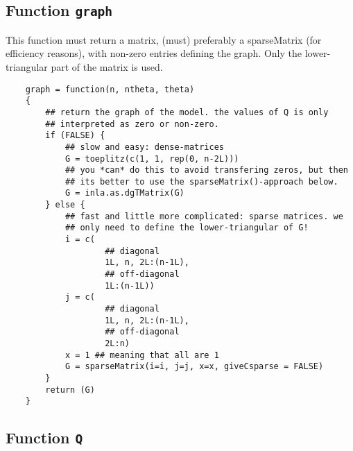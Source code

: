 \documentclass[a4paper,11pt]{article}
\begin{document}
\subsection*{Function \texttt{graph}}

This function must return a matrix, (must) preferably a sparseMatrix
(for efficiency reasons), with non-zero entries defining the
graph. Only the lower-triangular part of the matrix is used.
\begin{verbatim}
    graph = function(n, ntheta, theta)
    {
        ## return the graph of the model. the values of Q is only
        ## interpreted as zero or non-zero.
        if (FALSE) {
            ## slow and easy: dense-matrices
            G = toeplitz(c(1, 1, rep(0, n-2L)))
            ## you *can* do this to avoid transfering zeros, but then
            ## its better to use the sparseMatrix()-approach below.
            G = inla.as.dgTMatrix(G)
        } else {
            ## fast and little more complicated: sparse matrices. we
            ## only need to define the lower-triangular of G!
            i = c(
                    ## diagonal
                    1L, n, 2L:(n-1L),
                    ## off-diagonal
                    1L:(n-1L))
            j = c(
                    ## diagonal
                    1L, n, 2L:(n-1L),
                    ## off-diagonal
                    2L:n)
            x = 1 ## meaning that all are 1
            G = sparseMatrix(i=i, j=j, x=x, giveCsparse = FALSE)
        }            
        return (G)
    }
\end{verbatim}

\subsection*{Function \texttt{Q}}
\end{document}
